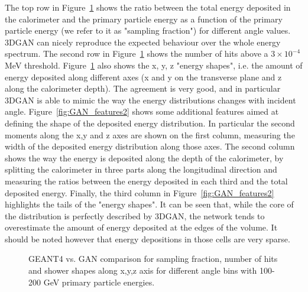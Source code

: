 The top row in Figure~\ref{fig:GAN_features1} shows the ratio between the total energy deposited in the calorimeter and the primary particle energy as a function of the primary particle energy (we refer to it as "sampling fraction") for different angle values. 3DGAN can nicely reproduce the expected behaviour over the whole energy spectrum. The second row in Figure~\ref{fig:GAN_features1} shows the number of hits above a $3 \times 10^{-4}$ MeV threshold. Figure~\ref{fig:GAN_features1} also shows the x, y, z "energy shapes", i.e. the amount of energy deposited along different axes (x and y on the transverse plane and z along the calorimeter depth). The agreement is very good, and in particular 3DGAN is able to mimic the way the energy distributions changes with incident angle. 
Figure~\ref{fig:GAN_features2} shows some additional features aimed at defining the shape of the deposited energy distribution. In particular the second moments along the x,y and z axes are shown on the first column, measuring the width of the deposited energy distribution along those axes. The second column shows the way the energy is deposited along the depth of the calorimeter, by splitting the calorimeter in three parts along the longitudinal direction and measuring the ratios between the energy deposited in each third  and the total deposited energy. Finally, the third column in Figure~\ref{fig:GAN_features2} highlights the tails of the "energy shapes". It can be seen that, while the core of the distribution is perfectly described by 3DGAN, the network tends to overestimate the amount of energy deposited at the edges of the volume. It should be noted however that energy depositions in those cells are very sparse. 
\iffalse
\begin{figure}
    \centering
    \texttt{[image: images/GAN\_feature\_ECAL\_E.png]}
    \texttt{[image: images/GAN\_feature\_ECAL\_nHits.png]}
    \texttt{[image: images/GAN\_feature\_ECAL\_ratioFirstLayerToSecondLayerE.png]}
    \texttt{[image: images/GAN\_feature\_ECAL\_ratioFirstLayerToTotalE.png]}
    \texttt{[image: images/GAN\_feature\_ECALmomentX1.png]}
    \texttt{[image: images/GAN\_feature\_ECALmomentX2.png]}
    \texttt{[image: images/GAN\_feature\_ECALmomentX3.png]}
    \texttt{[image: images/GAN\_feature\_ECALmomentY1.png]}
    \texttt{[image: images/GAN\_feature\_ECALmomentZ1.png]}
    \texttt{[image: images/GAN\_feature\_R9.png]}
    \caption{GAN vs. GEANT comparisons for various features. {\bf theta should be $\theta$.}
    \label{fig:GAN_features}}
\end{figure}
\fi
\begin{figure}
    \centering
    \caption{GEANT4 vs. GAN comparison for sampling fraction, number
      of hits and shower shapes along x,y,z axis for different angle
      bins with 100-200 GeV primary particle energies.
      \label{fig:GAN_features1}}
\end{figure}

